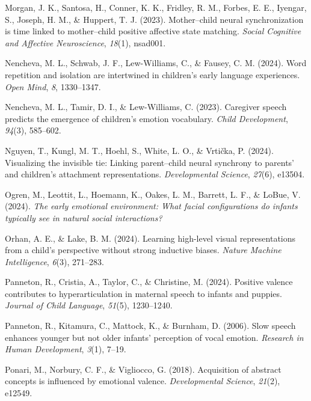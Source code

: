 \documentclass[10pt, letterpaper]{article}
\begin{document}
\begin{CSLReferences}{1}{0}
Morgan, J. K., Santosa, H., Conner, K. K., Fridley, R. M., Forbes, E.
E., Iyengar, S., Joseph, H. M., \& Huppert, T. J. (2023). Mother--child
neural synchronization is time linked to mother--child positive
affective state matching. \emph{Social Cognitive and Affective
Neuroscience}, \emph{18}(1), nsad001.

Nencheva, M. L., Schwab, J. F., Lew-Williams, C., \& Fausey, C. M.
(2024). Word repetition and isolation are intertwined in children's
early language experiences. \emph{Open Mind}, \emph{8}, 1330--1347.

Nencheva, M. L., Tamir, D. I., \& Lew-Williams, C. (2023). Caregiver
speech predicts the emergence of children's emotion vocabulary.
\emph{Child Development}, \emph{94}(3), 585--602.

Nguyen, T., Kungl, M. T., Hoehl, S., White, L. O., \& Vrtička, P.
(2024). Visualizing the invisible tie: Linking parent--child neural
synchrony to parents' and children's attachment representations.
\emph{Developmental Science}, \emph{27}(6), e13504.

Ogren, M., Leottit, L., Hoemann, K., Oakes, L. M., Barrett, L. F., \&
LoBue, V. (2024). \emph{The early emotional environment: What facial
configurations do infants typically see in natural social interactions?}

Orhan, A. E., \& Lake, B. M. (2024). Learning high-level visual
representations from a child's perspective without strong inductive
biases. \emph{Nature Machine Intelligence}, \emph{6}(3), 271--283.

Panneton, R., Cristia, A., Taylor, C., \& Christine, M. (2024). Positive
valence contributes to hyperarticulation in maternal speech to infants
and puppies. \emph{Journal of Child Language}, \emph{51}(5), 1230--1240.

Panneton, R., Kitamura, C., Mattock, K., \& Burnham, D. (2006). Slow
speech enhances younger but not older infants' perception of vocal
emotion. \emph{Research in Human Development}, \emph{3}(1), 7--19.

Ponari, M., Norbury, C. F., \& Vigliocco, G. (2018). Acquisition of
abstract concepts is influenced by emotional valence.
\emph{Developmental Science}, \emph{21}(2), e12549.


\end{CSLReferences}
\end{document}
